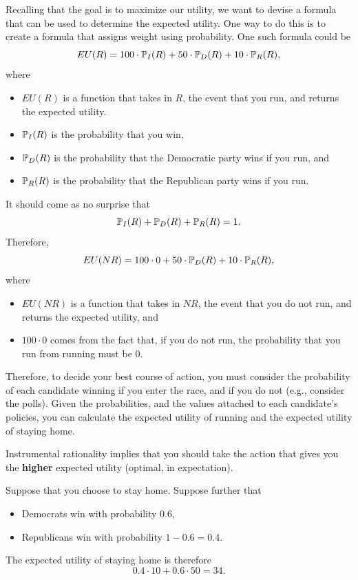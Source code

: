 \documentclass[letterpaper]{article}
\begin{document}
\begin{mdframed}
    Recalling that the goal is to maximize our utility, we want to devise a formula that can be used to determine the expected utility. One way to do this is to create a formula that assigns weight using probability. One such formula could be
    \[EU(R) = 100 \cdot \mathbb{P}_{I}(R) + 50 \cdot \mathbb{P}_{D}(R) + 10 \cdot \mathbb{P}_{R}(R),\]
    where 
    \begin{itemize}
        \item $EU(R)$ is a function that takes in $R$, the event that you run, and returns the expected utility.
        \item $\mathbb{P}_{I}(R)$ is the probability that you win, 
        \item $\mathbb{P}_{D}(R)$ is the probability that the Democratic party wins if you run, and 
        \item $\mathbb{P}_{R}(R)$ is the probability that the Republican party wins if you run. 
    \end{itemize} 
    It should come as no surprise that 
    \[\mathbb{P}_{I}(R) + \mathbb{P}_{D}(R) + \mathbb{P}_{R}(R) = 1.\]
    Therefore, 
    \[EU(NR) = 100 \cdot 0 + 50 \cdot \mathbb{P}_{D}(R) + 10 \cdot \mathbb{P}_{R}(R),\]
    where 
    \begin{itemize}
        \item $EU(NR)$ is a function that takes in $NR$, the event that you do not run, and returns the expected utility, and 
        \item $100 \cdot 0$ comes from the fact that, if you do not run, the probability that you run from running must be 0.
    \end{itemize}
    Therefore, to decide your best course of action, you must consider the probability of each candidate winning if you enter the race, and if you do not (e.g., consider the polls). Given the probabilities, and the values attached to each candidate's policies, you can calculate the expected utility of running and the expected utility of staying home. 

    \bigskip 

    Instrumental rationality implies that you should take the action that gives you the \textbf{higher} expected utility (optimal, in expectation).

    \bigskip 

    Suppose that you choose to stay home. Suppose further that 
    \begin{itemize}
        \item Democrats win with probability $0.6$,
        \item Republicans win with probability $1 - 0.6 = 0.4$.
    \end{itemize}
    The expected utility of staying home is therefore 
    \[0.4 \cdot 10 + 0.6 \cdot 50 = \boxed{34}.\]


\end{mdframed}
\end{document}
